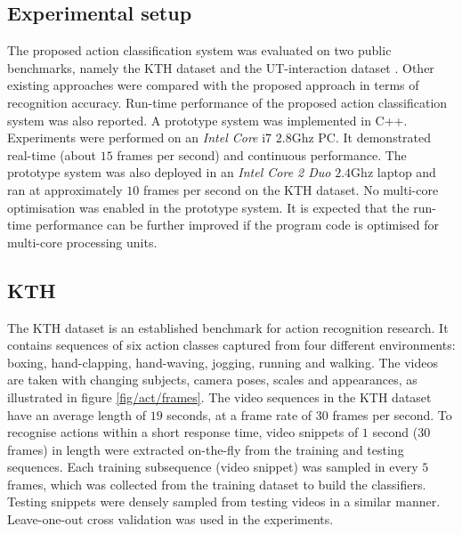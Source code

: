 \subsection{Experimental setup} 

The proposed action classification system was evaluated on two public benchmarks, namely the KTH dataset \cite{Schuldt2004} and the UT-interaction dataset \cite{Ryoo2010}. 
Other existing approaches were compared with the proposed approach in terms of recognition accuracy. 
Run-time performance of the proposed action classification system was also reported. A prototype system was implemented in C++. Experiments were performed on an \emph{Intel Core}\texttrademark \; i7 $2.8$Ghz PC. It demonstrated real-time (about $15$ frames per second) and continuous performance. 
The prototype system was also deployed in an \emph{Intel Core 2 Duo} $2.4$Ghz laptop and ran at approximately $10$ frames per second on the KTH dataset. 
No multi-core optimisation was enabled in the prototype system. It is expected that the run-time performance can be further improved if the program code is optimised for multi-core processing units.



\subsection{KTH}

The KTH dataset is an established benchmark for action recognition research. 
It contains sequences of six action classes captured from four different environments: boxing, hand-clapping, hand-waving, jogging, running and walking. 
The videos are taken with changing subjects, camera poses, scales and appearances, as illustrated in figure \ref{fig/act/frames}. 
The video sequences in the KTH dataset have an average length of $19$ seconds, at a frame rate of $30$ frames per second. 
To recognise actions within a short response time, video snippets of $1$ second ($30$ frames) in length were extracted on-the-fly from the training and testing sequences. 
Each training subsequence (video snippet) was sampled in every $5$ frames, which was collected from the training dataset to build the classifiers. 
Testing snippets were densely sampled from testing videos in a similar manner. 
Leave-one-out cross validation was used in the experiments. 

